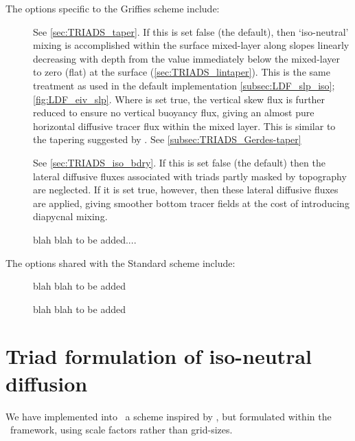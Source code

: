 \documentclass[../main/NEMO_manual]{subfiles}
\begin{document}
The options specific to the Griffies scheme include:
\begin{description}
\item [{}] See \autoref{sec:TRIADS_taper}.
  If this is set false (the default),
  then `iso-neutral' mixing is accomplished within the surface mixed-layer along slopes linearly decreasing with
  depth from the value immediately below the mixed-layer to zero (flat) at the surface (\autoref{sec:TRIADS_lintaper}).
  This is the same treatment as used in the default implementation
  \autoref{subsec:LDF_slp_iso}; \autoref{fig:LDF_eiv_slp}.
  Where  is set true,
  the vertical skew flux is further reduced to ensure no vertical buoyancy flux,
  giving an almost pure horizontal diffusive tracer flux within the mixed layer.
  This is similar to the tapering suggested by \citet{gerdes.koberle.ea_CD91}. See \autoref{subsec:TRIADS_Gerdes-taper}
\item [{}] See \autoref{sec:TRIADS_iso_bdry}.
  If this is set false (the default) then the lateral diffusive fluxes
  associated with triads partly masked by topography are neglected.
  If it is set true, however, then these lateral diffusive fluxes are applied,
  giving smoother bottom tracer fields at the cost of introducing diapycnal mixing.
\item [{}] blah blah to be added....
\end{description}
The options shared with the Standard scheme include:
\begin{description}
\item [{}] blah blah to be added
\item [{}]          blah blah to be added
\end{description}

\section{Triad formulation of iso-neutral diffusion}
\label{sec:TRIADS_iso}

We have implemented into \NEMO\ a scheme inspired by \citet{griffies.gnanadesikan.ea_JPO98},
but formulated within the \NEMO\ framework, using scale factors rather than grid-sizes.

\end{document}
